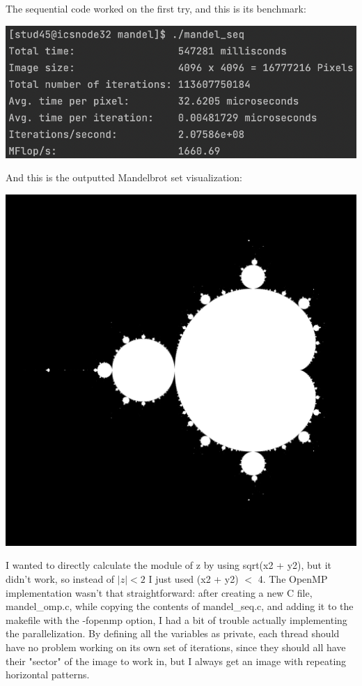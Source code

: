 \documentclass[unicode,11pt,a4paper,oneside,numbers=endperiod,openany]{scrartcl}
\begin{document}
The sequential code worked on the first try, and this is its benchmark:
\begin{center}
\includegraphics[width=0.7\linewidth]{bench_seq.png}
\end{center}
And this is the outputted Mandelbrot set visualization:
\begin{center}
\includegraphics[width=0.7\linewidth]{mandel.png}
\end{center}
I wanted to directly calculate the module of z by using sqrt(x2 + y2), but it didn't work, so instead of $|z| < 2$ I just used (x2 + y2) $<$ 4.
\newline
\newline
The OpenMP implementation wasn't that straightforward: after creating a new C file, mandel\_omp.c, while copying the contents of mandel\_seq.c, and adding it to the makefile with the -fopenmp option, I had a bit of trouble actually implementing the parallelization.
\newline
By defining all the variables as private, each thread should have no problem working on its own set of iterations, since they should all have their "sector" of the image to work in, but I always get an image with repeating horizontal patterns.
\end{document}
